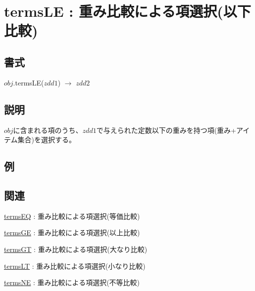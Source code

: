
\section{termsLE : 重み比較による項選択(以下比較)\label{sect:termsLE}}
\subsection*{書式}
$obj$.termsLE($zdd1$) $\rightarrow$ $zdd2$

\subsection*{説明}
$obj$に含まれる項のうち、$zdd1$で与えられた定数以下の重みを持つ項(重み+アイテム集合)を選択する。

\subsection*{例}


\subsection*{関連}
\hyperref[sect:termsEQ]{termsEQ} : 重み比較による項選択(等価比較)

\hyperref[sect:termsGE]{termsGE} : 重み比較による項選択(以上比較)

\hyperref[sect:termsGT]{termsGT} : 重み比較による項選択(大なり比較)

\hyperref[sect:termsLT]{termsLT} : 重み比較による項選択(小なり比較)

\hyperref[sect:termsNE]{termsNE} : 重み比較による項選択(不等比較)

